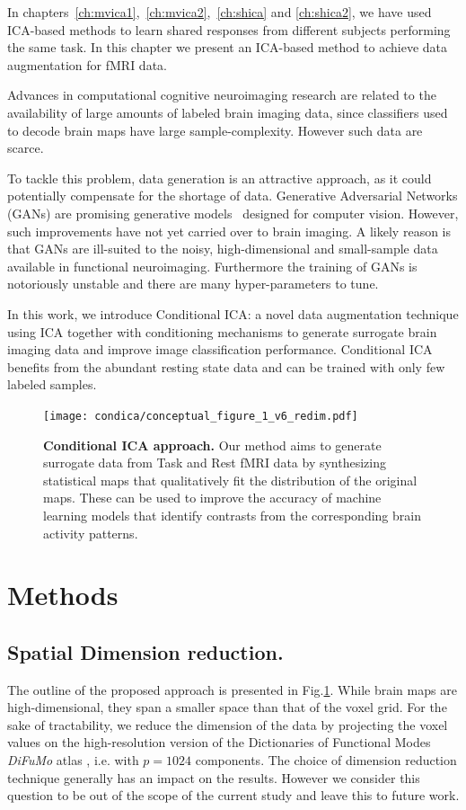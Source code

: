 In chapters~\ref{ch:mvica1},~\ref{ch:mvica2},~\ref{ch:shica} and
\ref{ch:shica2}, we have used ICA-based methods to learn shared responses from different
subjects performing the same task.
In this chapter we present an ICA-based method to achieve data augmentation for fMRI data.

  Advances in computational cognitive neuroimaging research are
  related to the availability of large amounts of labeled brain
imaging data, since classifiers used to decode brain maps have large
sample-complexity.
%
However such data are scarce.
%

To tackle this problem, data generation is an attractive approach, as
it could potentially compensate for the shortage of data.
Generative Adversarial Networks (GANs) are promising generative
models~\cite{goodfellow2014generative} designed for computer vision.
% 
However, such improvements have not yet carried over to brain imaging. A likely
reason is that GANs are ill-suited to the noisy, high-dimensional and
small-sample data available in functional neuroimaging. 
% 
Furthermore the training of GANs is notoriously unstable and there are many hyper-parameters to tune.
% 

  In this work, we introduce Conditional ICA: a novel data augmentation technique using ICA together with conditioning mechanisms to generate surrogate brain imaging data and improve image classification performance.
  Conditional ICA benefits from the abundant
  resting state data and can be trained with only few labeled samples.


%
\begin{figure}
\centerline{\texttt{[image: condica/conceptual\_figure\_1\_v6\_redim.pdf]}}
\caption{\textbf{Conditional ICA approach.} Our method aims to
  generate surrogate data from Task and Rest fMRI data by synthesizing
  statistical maps that qualitatively fit the distribution of the
  original maps. These can be used to improve the accuracy of
  machine learning models that identify contrasts from the
  corresponding brain activity patterns.}
\label{Fig0}
\end{figure}



\section{Methods}

\subsection{Spatial Dimension reduction.} 
The outline of the proposed approach is presented in Fig.\ref{Fig0}.
%
While brain maps are high-dimensional, they span a smaller space than that of
the voxel grid. 
%
For the sake of tractability, we reduce the dimension of the data by projecting the voxel values on the
high-resolution version of the Dictionaries of Functional Modes \emph{DiFuMo}
atlas \cite{dadi_fine-grain_2020}, i.e. with $p=1024$ components.
%
The choice of dimension reduction technique generally has an impact on the
results. However we consider this question to be out of the scope of the current study and leave this to future work.


